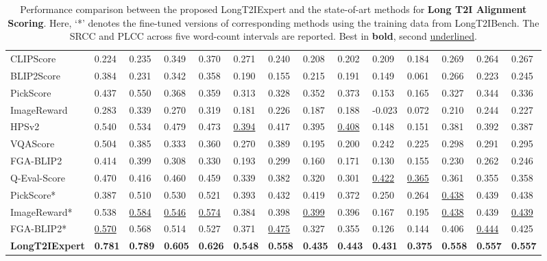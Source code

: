\documentclass[letterpaper]{article} %
\begin{document}
\begin{table}[t]
\begin{tabular}{l|ll|ll|ll|ll|ll|lll}
		CLIPScore     & 0.224 & 0.235 & 0.349 & 0.370 & 0.271 & 0.240 & 0.208 & 0.202 & 0.209 & 0.184 & 0.269 & 0.264 & 0.267 \\
		BLIP2Score    & 0.384 & 0.231 & 0.342 & 0.358 & 0.190 & 0.155 & 0.215 & 0.191 & 0.149 & 0.061 & 0.266 & 0.223 & 0.245 \\
		PickScore     & 0.437 & 0.550 & 0.368 & 0.359 & 0.313 & 0.328 & 0.352 & 0.373 & 0.153 & 0.165 & 0.327 & 0.344 & 0.336 \\
		ImageReward   & 0.283 & 0.339 & 0.270 & 0.319 & 0.181 & 0.226 & 0.187 & 0.188 & -0.023 & 0.072 & 0.210 & 0.244 & 0.227 \\
		HPSv2         & 0.540 & 0.534 & 0.479 & 0.473 & \underline{0.394} & 0.417 & 0.395 & \underline{0.408} & 0.148 & 0.151 & 0.381 & 0.392 & 0.387 \\
		VQAScore      & 0.504 & 0.385 & 0.333 & 0.360 & 0.270 & 0.389 & 0.195 & 0.200 & 0.242 & 0.225 & 0.298 & 0.291 & 0.295 \\
		FGA-BLIP2     & 0.414 & 0.399 & 0.308 & 0.330 & 0.193 & 0.299 & 0.160 & 0.171 & 0.130 & 0.155 & 0.230 & 0.262 & 0.246 \\
		Q-Eval-Score  & 0.470 & 0.416 & 0.460 & 0.459 & 0.339 & 0.382 & 0.320 & 0.301 & \underline{0.422} & \underline{0.365} & 0.361 & 0.355 & 0.358 \\
		\midrule
		PickScore*   & 0.387 & 0.510 & 0.530 & 0.521 & 0.393 & 0.432 & 0.419 & 0.372 & 0.250 & 0.264 & \underline{0.438} & 0.439 & 0.438 \\
		ImageReward* & 0.538 & \underline{0.584} & \underline{0.546} & \underline{0.574} & 0.384 & 0.398 & \underline{0.399} & 0.396 & 0.167 & 0.195 & \underline{0.438} & 0.439 & \underline{0.439} \\
		FGA-BLIP2*   & \underline{0.570} & 0.568 & 0.514 & 0.527 & 0.371 & \underline{0.475} & 0.327 & 0.355 & 0.126 & 0.144 & 0.406 & \underline{0.444} & 0.425 \\
		\midrule
		\textbf{LongT2IExpert} & \textbf{0.781} & \textbf{0.789} & \textbf{0.605} & \textbf{0.626} & \textbf{0.548} & \textbf{0.558} & \textbf{0.435} & \textbf{0.443} & \textbf{0.431} & \textbf{0.375} & \textbf{0.558} & \textbf{0.557} & \textbf{0.557} \\
		\bottomrule
	\end{tabular}
	\caption{Performance comparison between the proposed LongT2IExpert and the state-of-art methods for \textbf{Long T2I Alignment Scoring}. Here, `*' denotes the fine-tuned versions of corresponding methods using the training data from LongT2IBench. The SRCC and PLCC across five word-count intervals are reported. Best in \textbf{bold}, second \underline{underlined}.}  
	\label{tab:1}
\end{table}
\end{document}
